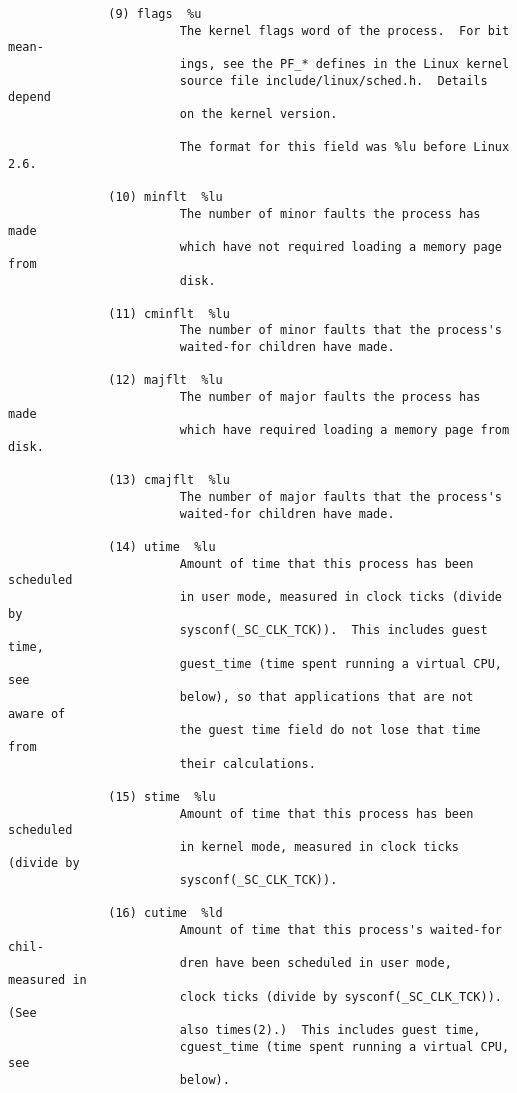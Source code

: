 \documentclass[]{article}
\begin{document}
\begin{verbatim}
              (9) flags  %u
                        The kernel flags word of the process.  For bit mean‐
                        ings, see the PF_* defines in the Linux kernel
                        source file include/linux/sched.h.  Details depend
                        on the kernel version.

                        The format for this field was %lu before Linux 2.6.

              (10) minflt  %lu
                        The number of minor faults the process has made
                        which have not required loading a memory page from
                        disk.

              (11) cminflt  %lu
                        The number of minor faults that the process's
                        waited-for children have made.

              (12) majflt  %lu
                        The number of major faults the process has made
                        which have required loading a memory page from disk.

              (13) cmajflt  %lu
                        The number of major faults that the process's
                        waited-for children have made.

              (14) utime  %lu
                        Amount of time that this process has been scheduled
                        in user mode, measured in clock ticks (divide by
                        sysconf(_SC_CLK_TCK)).  This includes guest time,
                        guest_time (time spent running a virtual CPU, see
                        below), so that applications that are not aware of
                        the guest time field do not lose that time from
                        their calculations.

              (15) stime  %lu
                        Amount of time that this process has been scheduled
                        in kernel mode, measured in clock ticks (divide by
                        sysconf(_SC_CLK_TCK)).

              (16) cutime  %ld
                        Amount of time that this process's waited-for chil‐
                        dren have been scheduled in user mode, measured in
                        clock ticks (divide by sysconf(_SC_CLK_TCK)).  (See
                        also times(2).)  This includes guest time,
                        cguest_time (time spent running a virtual CPU, see
                        below).


\end{verbatim}
\end{document}

